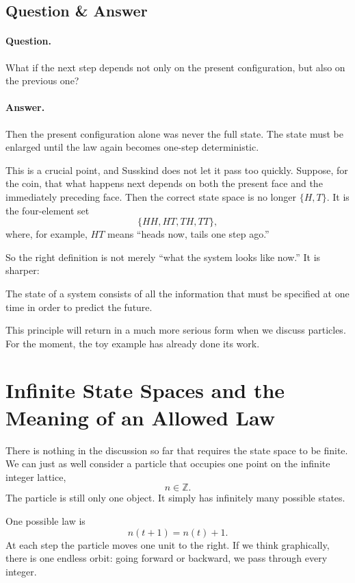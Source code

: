 \subsection{Question \& Answer}

\paragraph{Question.} What if the next step depends not only on the present configuration, but also on the previous one?

\paragraph{Answer.} Then the present configuration alone was never the full state. The state must be enlarged until the law again becomes one-step deterministic.

This is a crucial point, and Susskind does not let it pass too quickly. Suppose, for the coin, that what happens next depends on both the present face and the immediately preceding face. Then the correct state space is no longer \(\{H,T\}\). It is the four-element set
\[
\{HH,HT,TH,TT\},
\]
where, for example, \(HT\) means ``heads now, tails one step ago.''

So the right definition is not merely ``what the system looks like now.'' It is sharper:

\begin{definition}
The state of a system consists of all the information that must be specified at one time in order to predict the future.
\end{definition}

This principle will return in a much more serious form when we discuss particles. For the moment, the toy example has already done its work.

\section{Infinite State Spaces and the Meaning of an Allowed Law}

There is nothing in the discussion so far that requires the state space to be finite. We can just as well consider a particle that occupies one point on the infinite integer lattice,
\[
n\in\mathbb{Z}.
\]
The particle is still only one object. It simply has infinitely many possible states.

One possible law is
\begin{equation}
n(t+1)=n(t)+1.
\end{equation}
At each step the particle moves one unit to the right. If we think graphically, there is one endless orbit: going forward or backward, we pass through every integer.

